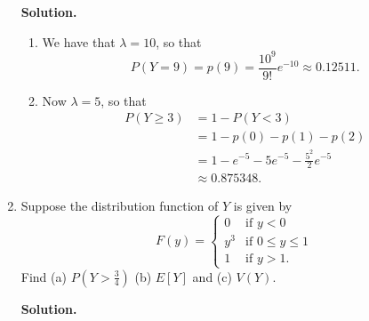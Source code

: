 \documentclass[9pt]{article}
\newcommand{\D}{\displaystyle}
\begin{document}
\begin{enumerate}
      \textbf{Solution.}

      \begin{enumerate}
         \item We have that $\lambda = 10$, so that
               $$P(Y = 9) = p(9) = \frac{10^9}{9!}e^{-10} \approx 0.12511.$$
         \item Now $\lambda = 5$, so that
               \begin{align*}
                  P(Y \ge 3) &= 1 - P(Y < 3) \\
                             &= 1 - p(0) - p(1) - p(2) \\
                             &= 1 - e^{-5} - 5e^{-5} - \frac{5^2}{2}e^{-5} \\
                             &\approx 0.875348.
               \end{align*} 
      \end{enumerate}
   \item Suppose the distribution function of $Y$ is given by
         \begin{equation*}
            F(y) = \begin{cases}
               0   & \text{if } y < 0 \\
               y^3 & \text{if } 0 \le y \le 1 \\
               1   & \text{if } y > 1.
            \end{cases}
         \end{equation*}
         Find (a) $\D P\left(Y > \frac{3}{4}\right)$ \qquad (b) $E[Y]$ \qquad 
                  and \qquad (c) $V(Y)$.

      \textbf{Solution.}


\end{enumerate}
\end{document}
